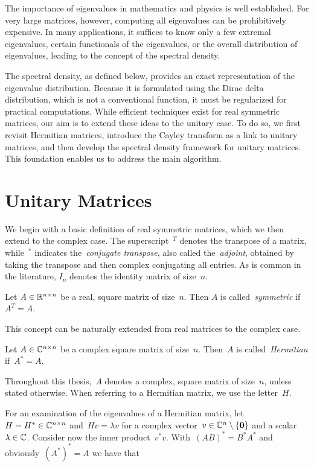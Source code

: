 The importance of eigenvalues in mathematics and physics is well established. For very large matrices, however, computing all eigenvalues can be prohibitively expensive. In many applications, it suffices to know only a few extremal eigenvalues, certain functionals of the eigenvalues, or the overall distribution of eigenvalues, leading to the concept of the spectral density.

The spectral density, as defined below, provides an exact representation of the eigenvalue distribution. Because it is formulated using the Dirac delta distribution, which is not a conventional function, it must be regularized for practical computations. While efficient techniques exist for real symmetric matrices, our aim is to extend these ideas to the unitary case. To do so, we first revisit Hermitian matrices, introduce the Cayley transform as a link to unitary matrices, and then develop the spectral density framework for unitary matrices. This foundation enables us to address the main algorithm.

\section{Unitary Matrices}

We begin with a basic definition of real symmetric matrices, which we then extend to the complex case. The superscript~$^T$ denotes the transpose of a matrix, while~$^*$ indicates the~\emph{conjugate transpose}, also called the~\emph{adjoint}, obtained by taking the transpose and then complex conjugating all entries. As is common in the literature, $I_n$ denotes the identity matrix of size~$n$.

\begin{definition}
    Let $A \in \mathbb{R}^{n \times n}$ be a real, square matrix of size~$n$. Then $A$ is called~\emph{symmetric} if~$A^T = A$.
\end{definition}
\noindent
This concept can be naturally extended from real matrices to the complex case.

\begin{definition}
    Let $A \in \mathbb{C}^{n \times n}$ be a complex square matrix of size~$n$. Then~$A$ is called~\emph{Hermitian} if~$A^* = A$.
\end{definition}
\noindent
Throughout this thesis,~$A$ denotes a complex, square matrix of size~$n$, unless stated otherwise. When referring to a Hermitian matrix, we use the letter~$H$.

For an examination of the eigenvalues of a Hermitian matrix, let~$H = H^* \in \mathbb{C}^{n \times n}$ and~$H v = \lambda v$ for a complex vector~$v \in \mathbb{C}^n \setminus \{\mathbf{0}\}$ and a scalar~$\lambda \in \mathbb{C}$. Consider now the inner product~$ v^* v$. With~$(A B)^* = B^* A^*$ and obviously~${(A^*)^*} = A$ we have that

